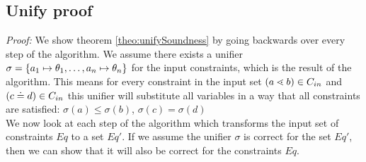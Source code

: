 
\subsection{Unify proof}


\textit{Proof:}
We show theorem \ref{theo:unifySoundness} by going backwards over every step of the algorithm.
We assume there exists a unifier $\sigma = $ for the input constraints,
which is the result of the \unify{} algorithm.
This means for every constraint in the input set $(a \lessdot b) \in C_{in}$ and $(c \doteq d) \in C_{in}$
this unifier will substitute all variables in a way that all constraints are satisfied:
$\sigma(a) \leq \sigma(b)$, $\sigma(c) = \sigma(d)$\\

We now look at each step of the \unify{} algorithm
which transforms the input set of constraints $Eq$ to a set $Eq'$.
If we assume the unifier $\sigma$ is correct for the set $Eq'$,
then we can show that it will also be correct for the constraints $Eq$. 

